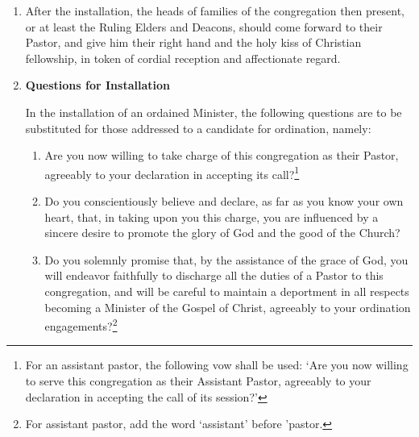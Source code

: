 \documentclass[
]{book}
\providecommand{\tightlist}{%
  \setlength{\itemsep}{0pt}\setlength{\parskip}{0pt}}
\begin{document}
\begin{enumerate}
\def\labelenumi{\arabic{enumi}.}
\setcounter{enumi}{8}
\item
  After the installation, the heads of families of the congregation then present, or at least the Ruling Elders and Deacons, should come forward to their Pastor, and give him their right hand and the holy kiss of Christian fellowship, in token of cordial reception and affectionate regard.
\item
  \protect\hypertarget{23.10}{\href{}{}} \textbf{Questions for Installation}

  In the installation of an ordained Minister, the following questions are to be substituted for those addressed to a candidate for ordination, namely:

  \begin{enumerate}
  \def\labelenumii{\alph{enumii}.}
  \tightlist
  \item
    Are you now willing to take charge of this congregation as their Pastor, agreeably to your declaration in accepting its call?\footnote{For an assistant pastor, the following vow shall be used: `Are you now willing to serve this congregation as their Assistant Pastor, agreeably to your declaration in accepting the call of its session?'}
  \item
    Do you conscientiously believe and declare, as far as you know your own heart, that, in taking upon you this charge, you are influenced by a sincere desire to promote the glory of God and the good of the Church?
  \item
    Do you solemnly promise that, by the assistance of the grace of God, you will endeavor faithfully to discharge all the duties of a Pastor to this congregation, and will be careful to maintain a deportment in all respects becoming a Minister of the Gospel of Christ, agreeably to your ordination engagements?\footnote{For assistant pastor, add the word `assistant' before 'pastor.}
  \end{enumerate}
\end{enumerate}
\end{document}
